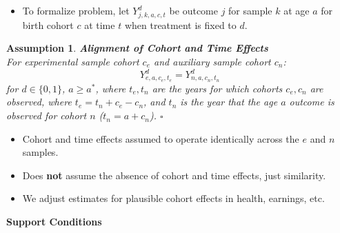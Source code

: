 \documentclass[static]{JJH-Beamer}
\newtheorem{assumption}{Assumption}
\begin{document}
\begin{frame}

\begin{itemize}
\item To formalize problem, let $Y_{j,k,a,c,t}^d$ be outcome $j$ for sample $k$ at age $a$ for birth cohort $c$ at time $t$ when treatment is fixed to $d$.
\end{itemize}

\begin{assumption}\label{ass:alignment} \textbf{Alignment of Cohort and Time Effects}\\
For experimental sample cohort $c_{e}$ and auxiliary sample cohort $c_{n}$:
\begin{equation}
Y_{e,a,c_{e},t_{e}}^d = Y_{n,a,c_{n},t_{n}}^d
\end{equation}
for $d \in \{ 0, 1\}$, $a \geq a^*$, where $t_{e}, t_{n}$ are the years for which cohorts $c_{e}, c_{n}$ are observed, where $t_e = t_n + c_e - c_n$, and $t_n$ is the year that the age $a$ outcome is observed for cohort $n$ ($t_n = a + c_n$). $\square$
\end{assumption}


\end{frame}

\begin{frame}

\begin{itemize}
\item Cohort and time effects assumed to operate identically across the $e$ and $n$ samples.
\item Does \textbf{not} assume the absence of cohort and time effects, just similarity.
\item We adjust estimates for plausible cohort effects in health, earnings, etc.
\end{itemize}

\end{frame}

\begin{frame}

\begin{center}
\textbf{Support Conditions}
\end{center}

\end{frame}
\end{document}
